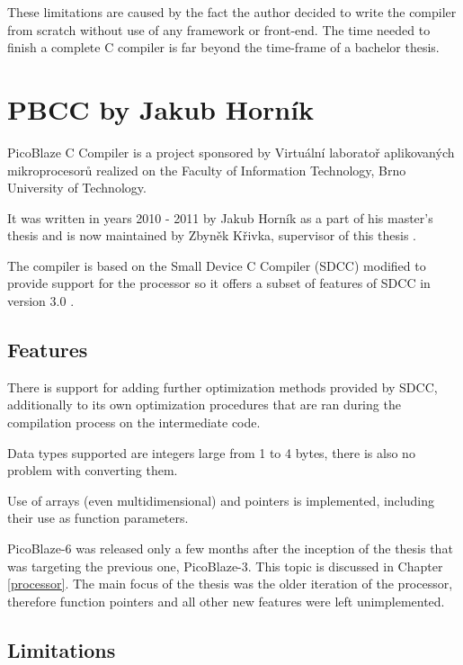         These limitations are caused by the fact the author decided to write the compiler
        from scratch without use of any framework or front-end. The time needed to finish a complete C compiler is far beyond the time-frame of a bachelor thesis.

    \section{PBCC by Jakub Horník}\label{prev_pbcc}

    PicoBlaze C Compiler is a project sponsored by Virtuální laboratoř aplikovaných mikroprocesorů
    realized on the Faculty of Information Technology, Brno University of Technology.

    It was written in years 2010 - 2011 by Jakub Horník as a part of his master's thesis and is now maintained by Zbyněk Křivka, supervisor of this thesis \cite{PbccProjekt}.

    The compiler is based on the Small Device C Compiler (SDCC) modified to provide support for the processor so it offers a subset of features of SDCC in version 3.0 \cite{PbccHornik}.

        \subsection{Features}

        There is support for adding further optimization methods provided by SDCC, additionally to its own optimization procedures 
        that are ran during the compilation process on the intermediate code.

        Data types supported are integers large from 1 to 4 bytes, there is also no problem with converting them.

        Use of arrays (even multidimensional) and pointers is implemented, including their use as function parameters.

        PicoBlaze-6 was released only a few months after the inception of the thesis that was targeting the previous one, PicoBlaze-3. This topic is discussed in Chapter \ref{processor}. The main focus of the thesis was the older iteration of the processor, therefore function pointers and all other new features were left unimplemented.

        \subsection{Limitations}

